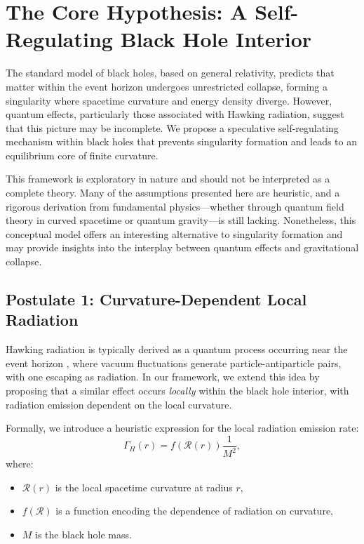 \section{The Core Hypothesis: A Self-Regulating Black Hole Interior}
\label{sec:core_hypothesis}

The standard model of black holes, based on general relativity, predicts that matter within the event horizon undergoes unrestricted collapse, forming a singularity where spacetime curvature and energy density diverge. However, quantum effects, particularly those associated with Hawking radiation, suggest that this picture may be incomplete. We propose a speculative self-regulating mechanism within black holes that prevents singularity formation and leads to an equilibrium core of finite curvature.

This framework is exploratory in nature and should not be interpreted as a complete theory. Many of the assumptions presented here are heuristic, and a rigorous derivation from fundamental physics—whether through quantum field theory in curved spacetime or quantum gravity—is still lacking. Nonetheless, this conceptual model offers an interesting alternative to singularity formation and may provide insights into the interplay between quantum effects and gravitational collapse.

\subsection{Postulate 1: Curvature-Dependent Local Radiation}
Hawking radiation is typically derived as a quantum process occurring near the event horizon \cite{hawking1975particle}, where vacuum fluctuations generate particle-antiparticle pairs, with one escaping as radiation. In our framework, we extend this idea by proposing that a similar effect occurs \textit{locally} within the black hole interior, with radiation emission dependent on the local curvature.

Formally, we introduce a heuristic expression for the local radiation emission rate:
\begin{equation}
    \Gamma_H(r) = f(\mathcal{R}(r)) \frac{1}{M^2},
\end{equation}
where:
\begin{itemize}
    \item \( \mathcal{R}(r) \) is the local spacetime curvature at radius \( r \),
    \item \( f(\mathcal{R}) \) is a function encoding the dependence of radiation on curvature,
    \item \( M \) is the black hole mass.
\end{itemize}

